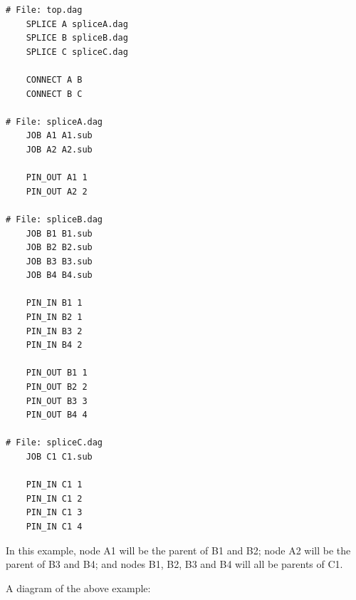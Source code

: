 \begin{verbatim}
# File: top.dag
    SPLICE A spliceA.dag
    SPLICE B spliceB.dag
    SPLICE C spliceC.dag

    CONNECT A B
    CONNECT B C

# File: spliceA.dag
    JOB A1 A1.sub
    JOB A2 A2.sub

    PIN_OUT A1 1
    PIN_OUT A2 2

# File: spliceB.dag
    JOB B1 B1.sub
    JOB B2 B2.sub
    JOB B3 B3.sub
    JOB B4 B4.sub

    PIN_IN B1 1
    PIN_IN B2 1
    PIN_IN B3 2
    PIN_IN B4 2

    PIN_OUT B1 1
    PIN_OUT B2 2
    PIN_OUT B3 3
    PIN_OUT B4 4

# File: spliceC.dag
    JOB C1 C1.sub

    PIN_IN C1 1 
    PIN_IN C1 2 
    PIN_IN C1 3
    PIN_IN C1 4

\end{verbatim}
In this example, node A1 will be the parent of B1 and B2; node
A2 will be the parent of B3 and B4; and nodes B1, B2, B3 and B4 will all
be parents of C1.

A diagram of the above example:

